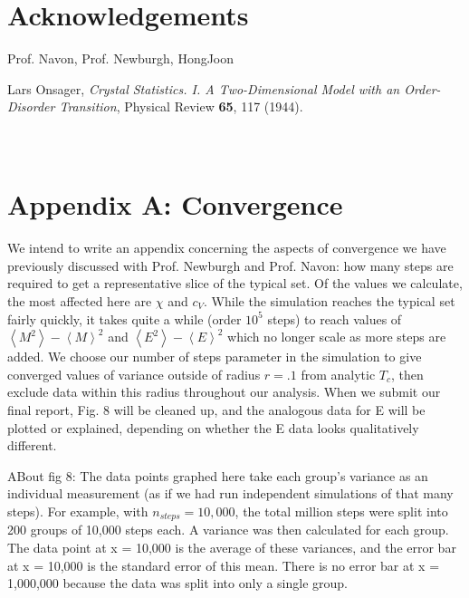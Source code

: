 \documentclass[letter,scriptaddress,twocolumn, prl]{revtex4}
\begin{document}


\section{Acknowledgements}
	Prof. Navon, Prof. Newburgh, HongJoon

 
%

\begin{thebibliography}{}
	
	Lars Onsager,
	\textit{Crystal Statistics. I. A Two-Dimensional Model with an Order-Disorder Transition},
	Physical Review {\bf 65}, 117 (1944).
	
	
\end{thebibliography}

\appendix
\section{\\Appendix A: Convergence}
We intend to write an appendix concerning the aspects of convergence we have previously discussed with Prof. Newburgh and Prof. Navon: how many steps are required to get a representative slice of the typical set. Of the values we calculate, the most affected here are $\chi$ and $c_V$. While the simulation reaches the typical set fairly quickly, it takes quite a while (order $10^5$ steps) to reach values of $\left\langle M^2 \right\rangle - \left\langle M \right\rangle ^2$ and $\left\langle E^2 \right\rangle - \left\langle E \right\rangle ^2$ which no longer scale as more steps are added. We choose our number of steps parameter in the simulation to give converged values of variance outside of radius $r = .1$ from analytic $T_c$, then exclude data within this radius throughout our analysis. When we submit our final report, Fig. 8 will be cleaned up, and the analogous data for E will be plotted or explained, depending on whether the E data looks qualitatively different.

ABout fig 8: The data points graphed here take each group's variance as an individual measurement (as if we had run independent simulations of that many steps). For example, with $n_{steps} = 10,000$, the total million steps were split into 200 groups of 10,000 steps each. A variance was then calculated for each group. The data point at x = 10,000 is the average of these variances, and the error bar at x = 10,000 is the standard error of this mean. There is no error bar at x = 1,000,000 because the data was split into only a single group.
\end{document}
